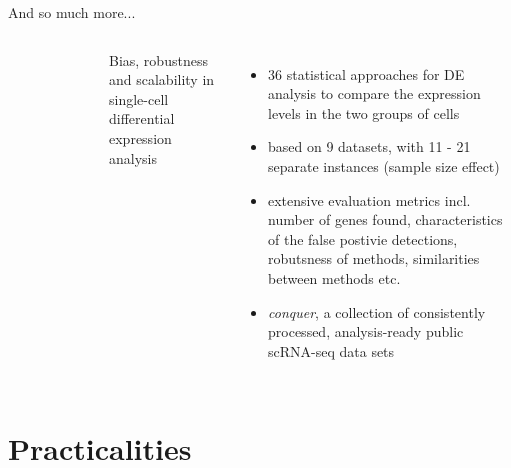 \documentclass{beamer}\usepackage[]{graphicx}\usepackage[]{color}
\begin{document}
\begin{frame}
And so much more...
\vspace{0.1cm}
\begin{columns}
\begin{center}
\begin{figure}
\includegraphics[width=5cm, height=6cm]{Images/Robinson-2018-heatmap}
\caption{\cite{Soneson2018}}
\end{figure}
\end{center}
\scriptsize
Bias, robustness and scalability in single-cell differential expression analysis
\begin{itemize}
  \item 36 statistical approaches for DE analysis to compare the expression levels in the two groups of cells
  \item based on 9 datasets, with 11 - 21 separate instances (sample size effect)
  \item extensive evaluation metrics incl. number of genes found, characteristics of the false postivie detections, robutsness of methods, similarities between methods etc. 
  \item \textit{conquer}, a collection of consistently processed, analysis-ready public scRNA-seq data sets
\end{itemize}
\end{columns}
\end{frame}


\section{Practicalities}
\begin{frame}
\begin{center}
\insertsection
\end{center}
\end{frame}
\end{document}

